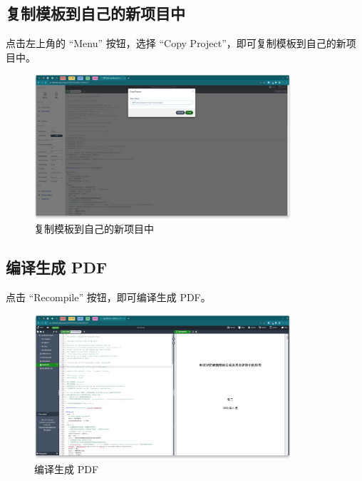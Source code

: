 \subsection{复制模板到自己的新项目中}

点击左上角的 ``Menu'' 按钮，选择 ``Copy Project''，即可复制模板到自己的新项目中。

\begin{figure}[H]
  \begin{center}
    \includegraphics[width=0.85\textwidth]{imgs/overleaf-copy-project.png}
  \end{center}
  \caption{复制模板到自己的新项目中}
  \label{fig:overleaf-copy-project}
\end{figure}

\subsection{编译生成 PDF}

点击 ``Recompile'' 按钮，即可编译生成 PDF。

\begin{figure}[H]
  \begin{center}
    \includegraphics[width=0.85\textwidth]{imgs/overleaf-compile.png}
  \end{center}
  \caption{编译生成 PDF}
  \label{fig:overleaf-recompile}
\end{figure}

